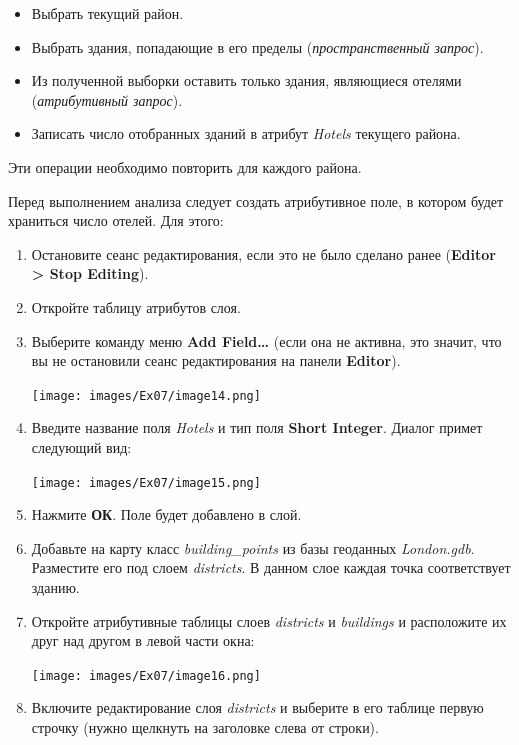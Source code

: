 \documentclass[12pt,]{book}
\begin{document}
\begin{itemize}
\item
  Выбрать текущий район.
\item
  Выбрать здания, попадающие в его пределы (\emph{пространственный запрос}).
\item
  Из полученной выборки оставить только здания, являющиеся отелями (\emph{атрибутивный запрос}).
\item
  Записать число отобранных зданий в атрибут \emph{Hotels} текущего района.
\end{itemize}

Эти операции необходимо повторить для каждого района.

Перед выполнением анализа следует создать атрибутивное поле, в котором будет храниться число отелей. Для этого:

\begin{enumerate}
\def\labelenumi{\arabic{enumi}.}
\item
  Остановите сеанс редактирования, если это не было сделано ранее (\textbf{Editor \textgreater{} Stop Editing}).
\item
  Откройте таблицу атрибутов слоя.
\item
  Выберите команду меню \textbf{Add Field\ldots{}} (если она не активна, это значит, что вы не остановили сеанс редактирования на панели \textbf{Editor}).

  \texttt{[image: images/Ex07/image14.png]}
\item
  Введите название поля \emph{Hotels} и тип поля \textbf{Short Integer}. Диалог примет следующий вид:

  \texttt{[image: images/Ex07/image15.png]}
\item
  Нажмите \textbf{ОК}. Поле будет добавлено в слой.
\item
  Добавьте на карту класс \emph{building\_points} из базы геоданных \emph{London.gdb}. Разместите его под слоем \emph{districts}. В данном слое каждая точка соответствует зданию.
\item
  Откройте атрибутивные таблицы слоев \emph{districts} и \emph{buildings} и расположите их друг над другом в левой части окна:

  \texttt{[image: images/Ex07/image16.png]}
\item
  Включите редактирование слоя \emph{districts} и выберите в его таблице первую строчку (нужно щелкнуть на заголовке слева от строки).


\end{enumerate}
\end{document}
